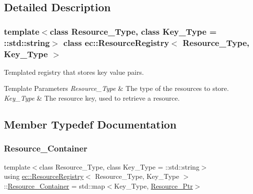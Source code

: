 \subsection{Detailed Description}
\subsubsection*{template$<$class Resource\+\_\+\+Type, class Key\+\_\+\+Type = \+::std\+::string$>$\newline
class ec\+::\+Resource\+Registry$<$ Resource\+\_\+\+Type, Key\+\_\+\+Type $>$}

Templated registry that stores key value pairs. 


\begin{DoxyTemplParams}{Template Parameters}
{\em Resource\+\_\+\+Type} & The type of the resources to store. \\
\hline
{\em Key\+\_\+\+Type} & The resource key, used to retrieve a resource. \\
\hline
\end{DoxyTemplParams}


\subsection{Member Typedef Documentation}
\mbox{\label{classec_1_1_resource_registry_ae87de43830e4ff17a2883ee2f10c368e}} 
\subsubsection{\texorpdfstring{Resource\+\_\+\+Container}{Resource\_Container}}
{\footnotesize\ttfamily template$<$class Resource\+\_\+\+Type, class Key\+\_\+\+Type = \+::std\+::string$>$ \\
using \mbox{\hyperlink{classec_1_1_resource_registry}{ec\+::\+Resource\+Registry}}$<$ Resource\+\_\+\+Type, Key\+\_\+\+Type $>$\+::\mbox{\hyperlink{classec_1_1_resource_registry_ae87de43830e4ff17a2883ee2f10c368e}{Resource\+\_\+\+Container}} =  std\+::map$<$Key\+\_\+\+Type, \mbox{\hyperlink{classec_1_1_resource_registry_aa3069d67662599730165c5d0df3043c9}{Resource\+\_\+\+Ptr}}$>$}

\mbox{\label{classec_1_1_resource_registry_aa3069d67662599730165c5d0df3043c9}} 
